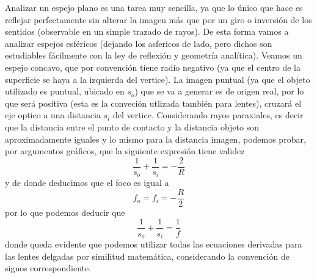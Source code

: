 \documentclass[a4paper,spanish]{article}
\numberwithin{equation}{section}
\begin{document}
		Analizar un espejo plano es una tarea muy sencilla, ya que lo \'unico que hace es reflejar perfectamente sin alterar la imagen m\'as que por un giro o inversi\'on de los sentidos (observable en un simple trazado de rayos). De esta forma vamos a analizar espejos esf\'ericos (dejando los asfericos de lado, pero dichos son estudiables f\'acilmente con la ley de reflexi\'on y geometr\'ia anal\'itica). Veamos un espejo concavo, que por convenci\'on tiene radio negativo (ya que el centro de la superficie se haya a la izquierda del vertice). La imagen puntual (ya que el objeto utilizado es puntual, ubicado en $s_o$) que se va a generar es de origen real, por lo que ser\'a positiva (esta es la conveci\'on utlizada tambi\'en para lentes), cruzar\'a el eje optico a una distancia $s_i$ del vertice. Considerando rayos paraxiales, es decir que la distancia entre el punto de contacto y la distancia objeto son aproximadamente iguales y lo mismo para la distancia imagen, podemos probar, por argumentos gr\'aficos, que la siguiente expresi\'on tiene validez
		\begin{equation}
			\frac{1}{s_o} + \frac{1}{s_i} = - \frac{2}{R}
			\label{eq:espejos_esfericos}
		\end{equation}
		y de donde deducimos que el foco es igual a
		\begin{equation}
			f_o = f_i = - \frac{R}{2}
			\label{eq:espejos_esfericos_foco}
		\end{equation}
		por lo que podemos deducir que
		\begin{equation}
		 \frac{1}{s_o} + \frac{1}{s_i} = \frac{1}{f}
		 \label{eq:espejos_esfericos_ecuacion}
		\end{equation}
		donde queda evidente que podemos utilizar todas las ecuaciones derivadas para las lentes delgadas por similitud matem\'atica, considerando la convenci\'on de signos correspondiente.
		
\end{document}
